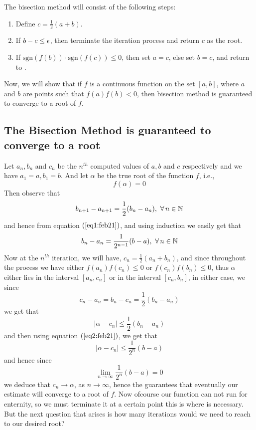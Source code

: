 The bisection method will consist of the following steps: 

\begin{theoremBox}
    \begin{enumerate}
        \item[] Define $c = \frac{1}{2}(a+b)$.
        \item[] If $b - c \leq \epsilon$, then terminate the iteration process and return $c$ as the root.
        \item[] If $\mbox{sgn}(f(b)) \cdot \mbox{sgn}(f(c)) \leq 0$, then set $a = c$, else set $b = c$, and return to .    
    \end{enumerate}
\end{theoremBox}

Now, we will show that if $f$ is a continuous function on the set $[a,b]$, where $a$ and $b$ are points such that $f(a)f(b) < 0$, then bisection method is guaranteed to converge to a root of $f$. 

\subsection{The Bisection Method is guaranteed to converge to a root}

Let $a_n, b_n$ and $c_n$ be the $n^{th}$ computed values of $a,b$ and $c$ respectively and we have $a_1 = a, b_1 = b$. And let $\alpha$ be the true root of the function $f$, i.e., 
\[
    f(\alpha) = 0  
\]
Then observe that 
\begin{equation}\label{eq1:feb21}
    b_{n+1} - a_{n+1} = \frac{1}{2} (b_n - a_n), \ \forall \, n \in \mathbb{N}
\end{equation}
and hence from equation $(\ref{eq1:feb21})$, and using induction we easily get that 
\begin{equation}\label{eq2:feb21}
    b_n - a_n = \frac{1}{2^{n-1}} (b-a), \ \forall \, n \in \mathbb{N}
\end{equation} 
Now at the $n^{th}$ iteration, we will have, $c_n = \frac{1}{2}(a_n+b_n)$, and since throughout the process we have either $f(a_n) f(c_n) \leq 0$ or $f(c_n) f(b_n) \leq 0$, thus $\alpha$ either lies in the interval $[a_n, c_n]$ or in the interval $[c_n,b_n]$, in either case, we since 
\[
    c_n - a_n = b_n - c_n = \frac{1}{2}(b_n - a_n)  
\]
we get that 
\begin{equation*}
    |\alpha - c_n| \leq \frac{1}{2} (b_n - a_n)
\end{equation*}
and then using equation $(\ref{eq2:feb21})$, we get that 
\begin{equation}\label{eq3:feb21}
    |\alpha - c_n| \leq \frac{1}{2^n} (b-a)
\end{equation}
and hence since \[\lim_{n \to \infty} \frac{1}{2^n}(b-a) = 0\] we deduce that $c_n \to \alpha$, as $n \to \infty$, hence the  guarantees that eventually our estimate will converge to a root of $f$. Now ofcourse our function can not run for enternity, so we must terminate it at a certain point this is where  is necessary. But the next question that arises is how many iterations would we need to reach to our desired root? 

